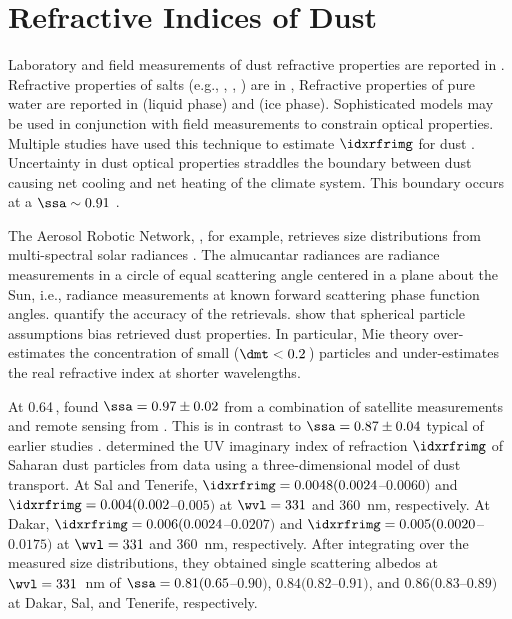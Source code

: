 \documentclass[12pt,twoside]{book}
\begin{document}
\section[Refractive Indices of Dust]{Refractive Indices of Dust}\label{sxn:idx_rfr_dst}
Laboratory and field measurements of dust refractive properties are 
reported in
\cite{PGS77,Vol73,Pat81,BoH83,TDH88,SAJ93,HKS98}. 
Refractive properties of salts (e.g., \NaCl, \NHqdSOq, \NHqNOt)
are in \cite{Vol73,TaM94,Tan97}, 
Refractive properties of pure water are reported in
\cite{Ray72,Seg81,WWQ89,PoF97} (liquid phase) and
\cite{Ray72,War84,PeG91} (ice phase).  
Sophisticated models may be used in conjunction with field
measurements to constrain optical properties.
Multiple studies have used this technique to estimate $\idxrfrimg$ for
dust \cite[][]{DuK00,Dub01,DHE02,DHL02,CTT02,STD03,Tor03}. 
Uncertainty in dust optical properties straddles the boundary between 
dust causing net cooling and net heating of the climate system.
This boundary occurs at a  
$\ssa \sim 0.91$ \cite[]{LiS982}.

The Aerosol Robotic Network, , for example, 
retrieves size distributions from multi-spectral solar
 radiances \cite[][]{DuK00}.
The almucantar radiances are radiance measurements in a circle of 
equal scattering angle centered in a plane about the Sun, i.e., 
radiance measurements at known forward scattering phase function 
angles.
\cite{DSH00} quantify the accuracy of the retrievals.
\cite{DHL02} show that spherical particle assumptions bias retrieved
dust properties. 
In particular, Mie theory over-estimates the concentration of small
($\dmt < 0.2$\,\um) particles and under-estimates the real refractive
index at shorter wavelengths.

At 0.64\,\um, \cite{KTD01} found $\ssa = 0.97 \pm 0.02$ from a
combination of satellite measurements and  remote
sensing from .
This is in contrast to $\ssa = 0.87 \pm 0.04$ typical of earlier
studies \cite[][]{SoT96}.
\cite{CTT02} determined the UV imaginary index of refraction
$\idxrfrimg$ of Saharan dust particles from  data using a 
three-dimensional model of dust transport.
At Sal and Tenerife, $\idxrfrimg = 0.0048 (0.0024$--$0.0060)$ and 
$\idxrfrimg = 0.004 (0.002$--$0.005)$ at $\wvl = 331$ and $360$~nm,
respectively. 
At Dakar, $\idxrfrimg = 0.006 (0.0024$--$0.0207)$ and 
$\idxrfrimg = 0.005 (0.0020$--$0.0175)$ at $\wvl = 331$ and $360$~nm, 
respectively. 
After integrating over the measured size distributions, they obtained
single scattering albedos at $\wvl = 331$~nm of 
$\ssa = 0.81 (0.65$--$0.90)$, $0.84 (0.82$--$0.91)$, and 
$0.86 (0.83$--$0.89)$ 
at Dakar, Sal, and Tenerife, respectively.
\end{document}
